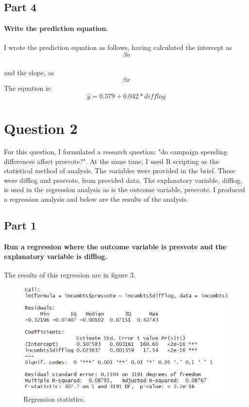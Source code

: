 \documentclass{article}
\begin{document}
		\subsection{Part 4}
	\paragraph{Write the prediction equation.}
	I wrote the prediction equation as follows, having calculated the intercept as 
	\begin{equation}
		\beta o
	\end{equation} 
	\paragraph{}and the slope, as 
	\begin{equation}
		\beta x
	\end{equation}The equation is:
	\begin{equation}
		\hat{y} = 0.579 + 0.042 * difflog
		\end{equation}
	\section{Question 2}

	For this question, I formulated a research question: "do campaign spending differences affect presvote?". At the same time, I used R scripting as the statistical method of analysis. The variables were provided in the brief. These were difflog and presvote, from provided data. The explanatory variable, difflog, is used in the regression analysis as is the outcome variable, presvote. I produced a regression analysis and below are the results of the analysis.   
\subsection{Part 1}
\paragraph{Run a regression where the outcome variable is presvote and the explanatory variable is difflog.}
The results of this regression are in figure 3.
\begin{figure}[H]
	\centering
	\includegraphics[width=0.9\linewidth]{Question2RegressionAnalysis.jpg}
	\caption{Regression statistics.}
	\label{fig:Regression statistics}
\end{figure}
\end{document}
